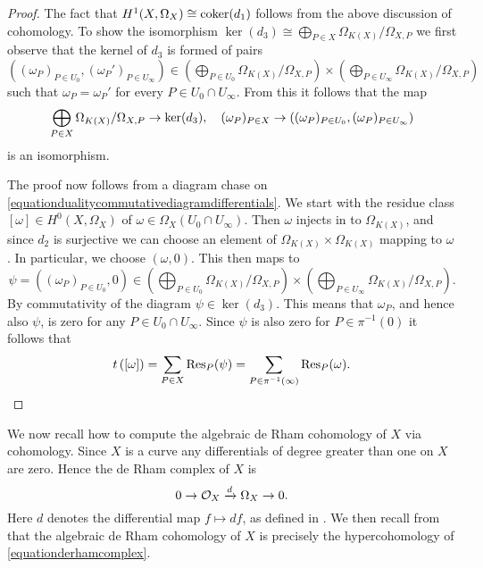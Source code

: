\begin{proof}
    The fact that $H^1(X,\Omega_X) \cong {\rm coker}(d_1)$ follows from the above discussion of \cech cohomology.
    To show the isomorphism $\ker(d_3) \cong \bigoplus_{P \in X} \Omega_{K(X)}/\Omega_{X,P}$ we first observe that the kernel of $d_3$ is formed of pairs $ ((\omega_P)_{P \in U_0}, (\omega_P')_{P \in U_\infty})\in \left( \bigoplus_{P \in U_0} \Omega_{K(X)}/\Omega_{X,P} \right) \times \left( \bigoplus_{P \in  U_\infty} \Omega_{K(X)}/\Omega_{X,P} \right)$ such that $\omega_P = \omega_P'$ for every $ P \in U_0 \cap U_\infty$.
    From this it follows that the map 
        \[
        \bigoplus_{P \in X} \Omega_{K(X)}/\Omega_{X,P}\rightarrow\ker(d_3), \quad  (\omega_P)_{P \in X} \to \left( (\omega_P)_{ P \in U_0}, (\omega_P)_{P \in U_\infty} \right)
        \]
    is an isomorphism.
    
    The proof now follows from a diagram chase on \eqref{equationdualitycommutativediagramdifferentials}.
    We start with the residue class $[ \omega ] \in H^0(X,\Omega_X)$ of $\omega \in \Omega_X(U_0 \cap U_\infty)$.
    Then $\omega$ injects in to $\Omega_{K(X)}$, and since $d_2$ is surjective we can choose an element of $\Omega_{K(X)} \times \Omega_{K(X)}$ mapping to $\omega$.
    In particular, we choose $(\omega,0)$.
    This then maps to 
        \[
        \psi = (({\omega}_P)_{P\in U_0}, 0) \in \left( \bigoplus_{P \in U_0} \Omega_{K(X)}/\Omega_{X,P}\right) \times \left( \bigoplus_{P \in U_\infty} \Omega_{K(X)}/\Omega_{X,P} \right).
        \]
    By commutativity of the diagram $\psi \in \ker(d_3)$.
    This means that $\omega_P$, and hence also $\psi$, is zero for any $P \in U_0 \cap U_\infty$.
    Since $\psi$ is also zero for $P \in \pi^{-1}(0)$ it follows that 
        \[
        t\left([ \omega ] \right) = \sum_{P \in X}\operatorname{Res}_P(\psi) = \sum_{P \in \pi^{-1}(\infty)} \operatorname{Res}_P(\omega).
        \]
    \end{proof}

We now recall how to compute the algebraic de Rham cohomology of $X$ via \cech cohomology.
Since $X$ is a curve any differentials of degree greater than one on $X$ are zero.
Hence the de Rham complex of $X$ is 
    \begin{equation}\label{equationderhamcomplex}
    0 \rightarrow {\cal O}_X \xrightarrow{d} \Omega_X \rightarrow 0.
    \end{equation}
Here $d$ denotes the differential map $f \mapsto df$, as defined in \cite[Chap.\ II, Pg.\ 172]{hart}.
We then recall from \cite[Pg.\ 351]{grothendiecklettertoatiyah} that the algebraic de Rham cohomology of $X$ is precisely the hypercohomology of \eqref{equationderhamcomplex}.

